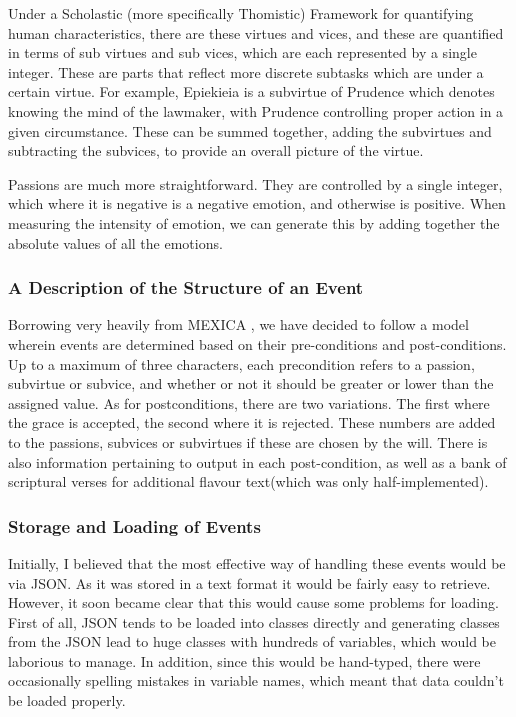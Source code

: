 \documentclass[12pt]{article}
\begin{document}
Under a Scholastic (more specifically Thomistic) Framework for quantifying human characteristics, there are these virtues and vices, and these are quantified in terms of sub virtues and sub vices, which are each represented by a single integer. These are parts that reflect more discrete subtasks which are under a certain virtue. For example, Epiekieia is a subvirtue of Prudence which denotes knowing the mind of the lawmaker, with Prudence controlling proper action in a given circumstance. These can be summed together, adding the subvirtues and subtracting the subvices, to provide an overall picture of the virtue.

Passions are much more straightforward. They are controlled by a single integer, which where it is negative is a negative emotion, and otherwise is positive. When measuring the intensity of emotion, we can generate this by adding together the absolute values of all the emotions.\\

\subsubsection{A Description of the Structure of an Event}
Borrowing very heavily from MEXICA \cite{MEXICA}, we have decided to follow a model wherein events are determined based on their pre-conditions and post-conditions. Up to a maximum of three characters, each precondition refers to a passion, subvirtue or subvice, and whether or not it should be greater or lower than the assigned value. As for postconditions, there are two variations. The first where the grace is accepted, the second where it is rejected. These numbers are added to the passions, subvices or subvirtues if these are chosen by the will. There is also information pertaining to output in each post-condition, as well as a bank of scriptural verses for additional flavour text(which was only half-implemented).

\subsubsection{Storage and Loading of Events} 
Initially, I believed that the most effective way of handling these events would be via JSON. As it was stored in a text format it would be fairly easy to retrieve. However, it soon became clear that this would cause some problems for loading. First of all, JSON tends to be loaded into classes directly and generating classes from the JSON lead to huge classes with hundreds of variables, which would be laborious to manage. In addition, since this would be hand-typed, there were occasionally spelling mistakes in variable names, which meant that data couldn't be loaded properly.\\
\end{document}
